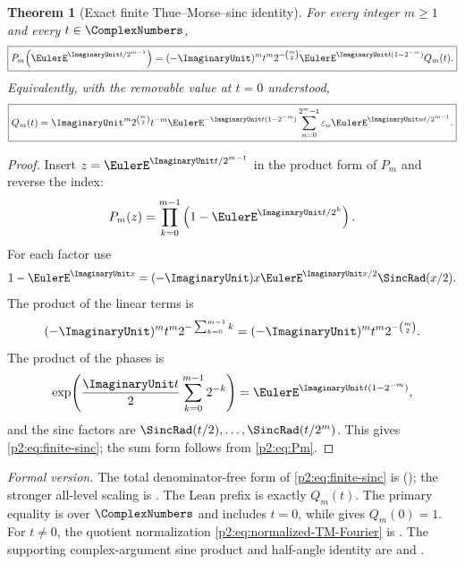 \documentclass[11pt,oneside]{article}
\numberwithin{equation}{section}
\newtheorem{theorem}{Theorem}[section]
\theoremstyle{definition}
\theoremstyle{remark}
\newcommand{\eps}{\varepsilon}
\begin{document}
\begin{theorem}[Exact finite Thue--Morse--sinc identity]
\label{p2:thm:finite-sinc}
For every integer $m\ge1$ and every $t\in\ComplexNumbers$,
\begin{equation}
 \boxed{
 P_m\!\left(\EulerE^{\ImaginaryUnit t/2^{m-1}}\right)
 =(-\ImaginaryUnit)^m t^m 2^{-\binom m2}
   \EulerE^{\ImaginaryUnit t(1-2^{-m})}Q_m(t).}
 \label{p2:eq:finite-sinc}
\end{equation}
Equivalently, with the removable value at $t=0$ understood,
\begin{equation}
 \boxed{
 Q_m(t)=\ImaginaryUnit^m2^{\binom m2}t^{-m}
 \EulerE^{-\ImaginaryUnit t(1-2^{-m})}
 \sum_{n=0}^{2^m-1}\eps_n\EulerE^{\ImaginaryUnit nt/2^{m-1}}.}
 \label{p2:eq:normalized-TM-Fourier}
\end{equation}
\newresult
\end{theorem}

\begin{proof}
Insert $z=\EulerE^{\ImaginaryUnit t/2^{m-1}}$ in the product form of $P_m$ and reverse the
index:
\[
 P_m(z)=\prod_{k=0}^{m-1}\left(1-\EulerE^{\ImaginaryUnit t/2^k}\right).
\]
For each factor use
\[
 1-\EulerE^{\ImaginaryUnit x}=(-\ImaginaryUnit)x\EulerE^{\ImaginaryUnit x/2}\SincRad(x/2).
\]
The product of the linear terms is
\[
 (-\ImaginaryUnit)^m t^m2^{-\sum_{k=0}^{m-1}k}
 =(-\ImaginaryUnit)^m t^m2^{-\binom m2}.
\]
The product of the phases is
\[
 \exp\!\left(\frac{\ImaginaryUnit t}{2}\sum_{k=0}^{m-1}2^{-k}\right)
 =\EulerE^{\ImaginaryUnit t(1-2^{-m})},
\]
and the sinc factors are $\SincRad(t/2),\ldots,\SincRad(t/2^m)$.  This gives
\eqref{p2:eq:finite-sinc}; the sum form follows from \eqref{p2:eq:Pm}.
\end{proof}

\emph{Formal version.}  The total denominator-free form of
\eqref{p2:eq:finite-sinc} is
(); the stronger all-level scaling is
.  The Lean prefix
 is exactly $Q_m(t)$.
The primary equality is over $\ComplexNumbers$ and includes $t=0$, while
 gives $Q_m(0)=1$.
For $t\ne0$, the quotient normalization
\eqref{p2:eq:normalized-TM-Fourier} is
.
The supporting complex-argument sine product and half-angle identity are
 and
.
\end{document}
